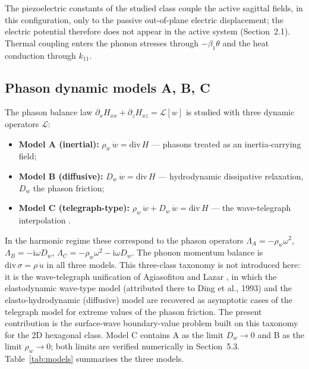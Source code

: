 \documentclass[11pt]{article}
\newcommand{\om}{\omega}
\newcommand{\sig}{\sigma}
\newcommand{\tht}{\theta}
\newcommand{\Dw}{D_w}
\newcommand{\rw}{\rho_w}
\begin{document}
The piezoelectric constants of the studied class \cite{wang2021,agiasofitou2023} couple the active sagittal fields, in this configuration, only to the passive out-of-plane electric displacement; the electric potential therefore does not appear in the active system (Section~2.1). Thermal coupling enters the phonon stresses through $-\beta_1\tht$ and the heat conduction through $k_{11}$.

\subsection{Phason dynamic models A, B, C}

The phason balance law $\partial_x H_{xx}+\partial_z H_{xz}=\mathcal{L}[w]$ is studied with three dynamic operators $\mathcal{L}$:
\begin{itemize}
\item \textbf{Model A (inertial):} $\rw\,\ddot w=\mathrm{div}\,H$ --- phasons treated as an inertia-carrying field;
\item \textbf{Model B (diffusive):} $\Dw\,\dot w=\mathrm{div}\,H$ --- hydrodynamic dissipative relaxation, $\Dw$ the phason friction;
\item \textbf{Model C (telegraph-type):} $\rw\,\ddot w+\Dw\,\dot w=\mathrm{div}\,H$ --- the wave-telegraph interpolation \cite{agiasofitou2014}.
\end{itemize}
In the harmonic regime these correspond to the phason operators $\Lambda_A=-\rw\om^2$, $\Lambda_B=-\mathrm{i}\om\Dw$, $\Lambda_C=-\rw\om^2-\mathrm{i}\om\Dw$. The phonon momentum balance is $\mathrm{div}\,\sig=\rho\,\ddot u$ in all three models. This three-class taxonomy is not introduced here: it is the wave-telegraph unification of Agiasofitou and Lazar \cite{agiasofitou2014}, in which the elastodynamic wave-type model (attributed there to Ding et al., 1993) and the elasto-hydrodynamic (diffusive) model \cite{lubensky1985} are recovered as asymptotic cases of the telegraph model for extreme values of the phason friction. The present contribution is the surface-wave boundary-value problem built on this taxonomy for the 2D hexagonal class. Model C contains A as the limit $\Dw\to0$ and B as the limit $\rw\to0$; both limits are verified numerically in Section~5.3. Table~\ref{tab:models} summarises the three models.
\end{document}
